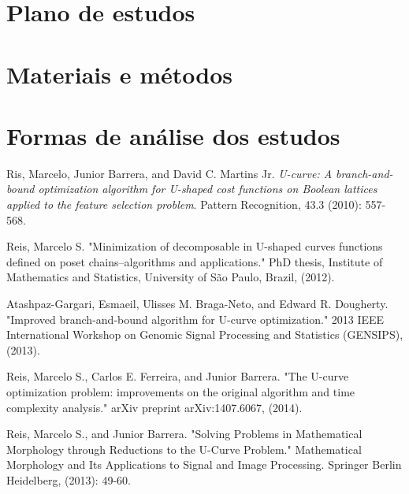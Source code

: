 \documentclass[12pt]{article}
\begin{document}
\section{Plano de estudos}

\section{Materiais e métodos}

\section{Formas de análise dos estudos}

\begin{thebibliography}{9}

Ris, Marcelo, Junior Barrera, and David C. Martins Jr. \emph{U-curve: A branch-and-bound optimization algorithm for U-shaped cost functions on Boolean lattices applied to the feature selection problem}. Pattern Recognition, 43.3 (2010): 557-568.

Reis, Marcelo S. "Minimization of decomposable in U-shaped curves functions defined on poset chains–algorithms and applications." PhD thesis, Institute of Mathematics and Statistics, University of São Paulo, Brazil, (2012).

Atashpaz-Gargari, Esmaeil, Ulisses M. Braga-Neto, and Edward R. Dougherty. "Improved branch-and-bound algorithm for U-curve optimization." 2013 IEEE International Workshop on Genomic Signal Processing and Statistics (GENSIPS), (2013).

Reis, Marcelo S., Carlos E. Ferreira, and Junior Barrera. "The U-curve optimization problem: improvements on the original algorithm and time complexity analysis." arXiv preprint arXiv:1407.6067, (2014). 

Reis, Marcelo S., and Junior Barrera. "Solving Problems in Mathematical Morphology through Reductions to the U-Curve Problem." Mathematical Morphology and Its Applications to Signal and Image Processing. Springer Berlin Heidelberg, (2013): 49-60.

\end{thebibliography}
\end{document}

